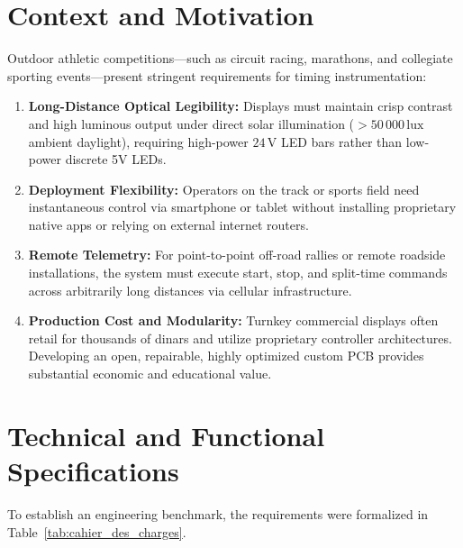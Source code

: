 \documentclass[12pt,a4paper,oneside]{report}
\begin{document}
\section{Context and Motivation}
Outdoor athletic competitions—such as circuit racing, marathons, and collegiate sporting events—present stringent requirements for timing instrumentation:
\begin{enumerate}
    \item \textbf{Long-Distance Optical Legibility:} Displays must maintain crisp contrast and high luminous output under direct solar illumination ($> 50\,000\,\text{lux}$ ambient daylight), requiring high-power $24\,\text{V}$ LED bars rather than low-power discrete 5V LEDs.
    \item \textbf{Deployment Flexibility:} Operators on the track or sports field need instantaneous control via smartphone or tablet without installing proprietary native apps or relying on external internet routers.
    \item \textbf{Remote Telemetry:} For point-to-point off-road rallies or remote roadside installations, the system must execute start, stop, and split-time commands across arbitrarily long distances via cellular infrastructure.
    \item \textbf{Production Cost and Modularity:} Turnkey commercial displays often retail for thousands of dinars and utilize proprietary controller architectures. Developing an open, repairable, highly optimized custom PCB provides substantial economic and educational value.
\end{enumerate}

\section{Technical and Functional Specifications}
To establish an engineering benchmark, the requirements were formalized in Table~\ref{tab:cahier_des_charges}.
\end{document}
